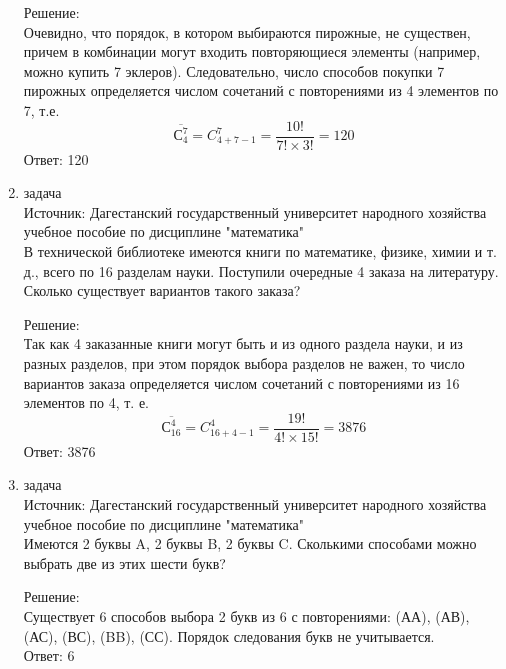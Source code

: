 \documentclass[a4paper,14pt]{extreport} %
\begin{document}
\begin{center}
\begin{enumerate}
						 Решение:\\
						 Очевидно, что порядок, в котором выбираются
						 пирожные, не существен, причем в комбинации могут входить повторяющиеся элементы (например, можно купить 7 эклеров).
						 Следовательно, число способов покупки 7 пирожных определяется
						 числом сочетаний с повторениями из 4 элементов по 7, т.е.
						 \begin{equation}
						 	\overline{С_4^7}=C_{4+7-1}^7=\frac{10!}{7!\times3!}=120
						 \end{equation}
						 Ответ: 120
						 \newpage
						 
						 \item {\large задача }\\
						 Источник: Дагестанский государственный университет народного хозяйства учебное пособие по дисциплине "математика"  \\
						 \vspace{15pt}
						 В технической библиотеке имеются книги по математике,
						 физике, химии и т. д., всего по 16 разделам науки. Поступили
						 очередные 4 заказа на литературу. Сколько существует вариантов
						 такого заказа?
						  \\
						 \vspace{15pt}
						 
						 Решение:\\
						 Так как 4 заказанные книги могут быть и из одного
						 раздела науки, и из разных разделов, при этом порядок выбора
						 разделов не важен, то число вариантов заказа определяется числом
						 сочетаний с повторениями из 16 элементов по 4, т. е.
						 \begin{equation}
						 	\overline{С_{16}^4}=C_{16+4-1}^4=\frac{19!}{4!\times15!}=3876
						 \end{equation}
						 Ответ: 3876
						 
						 
						 
						 \item {\large задача }\\
						 Источник: Дагестанский государственный университет народного хозяйства учебное пособие по дисциплине "математика"  \\
						 \vspace{15pt}
						 Имеются 2 буквы A, 2 буквы B, 2 буквы C. Сколькими
						 способами можно выбрать две из этих шести букв?\\
						 \vspace{15pt}
						 
						 Решение:\\
						 Существует 6 способов выбора 2 букв из 6 с
						 повторениями: (АА), (АВ), (АС), (ВС), (BB), (СС). Порядок следования
						 букв не учитывается.\\
						 Ответ: 6
						 

\end{enumerate}
\end{center}
\end{document}
